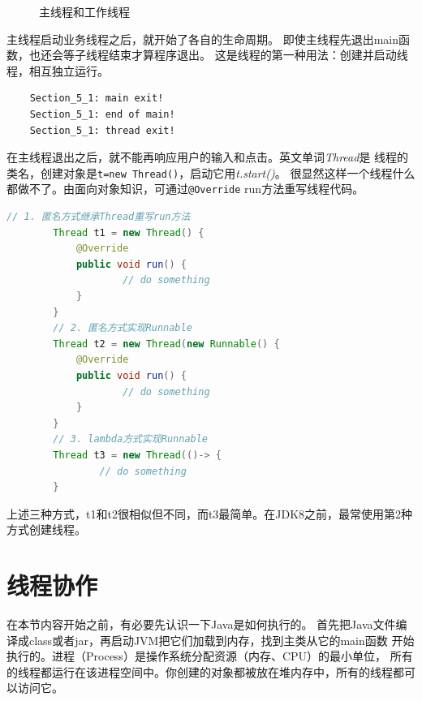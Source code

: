\vspace{0.6cm}
\begin{figure}[!htb]
\begin{center}
\end{center}
\caption{主线程和工作线程}
\end{figure}
\vspace{0.3cm}

主线程启动业务线程之后，就开始了各自的生命周期。
即使主线程先退出main函数，也还会等子线程结束才算程序退出。
这是线程的第一种用法：创建并启动线程，相互独立运行。

\begin{lstlisting}
	Section_5_1: main exit!
	Section_5_1: end of main!
	Section_5_1: thread exit!
\end{lstlisting}

在主线程退出之后，就不能再响应用户的输入和点击。英文单词\emph{Thread}是
线程的类名，创建对象是\lstinline{t=new Thread()}，启动它用\emph{t.start()}。
很显然这样一个线程什么都做不了。由面向对象知识，可通过\lstinline{@Override}
run方法重写线程代码。

\begin{lstlisting}[language=Java,mathescape]
		// 1. 匿名方式继承Thread重写run方法
		Thread t1 = new Thread() {
			@Override
			public void run() {
					// do something
			}
		}
		// 2. 匿名方式实现Runnable
		Thread t2 = new Thread(new Runnable() {
			@Override
			public void run() {
					// do something
			}
		}
		// 3. lambda方式实现Runnable
		Thread t3 = new Thread(()-> {
				// do something
		}
\end{lstlisting}

上述三种方式，t1和t2很相似但不同，而t3最简单。在JDK8之前，最常使用第2种方式创建线程。

\section{线程协作}
在本节内容开始之前，有必要先认识一下Java是如何执行的。
首先把Java文件编译成class或者jar，再启动JVM把它们加载到内存，找到主类从它的main函数
开始执行的。进程（Process）是操作系统分配资源（内存、CPU）的最小单位，
所有的线程都运行在该进程空间中。你创建的对象都被放在堆内存中，所有的线程都可以访问它。

